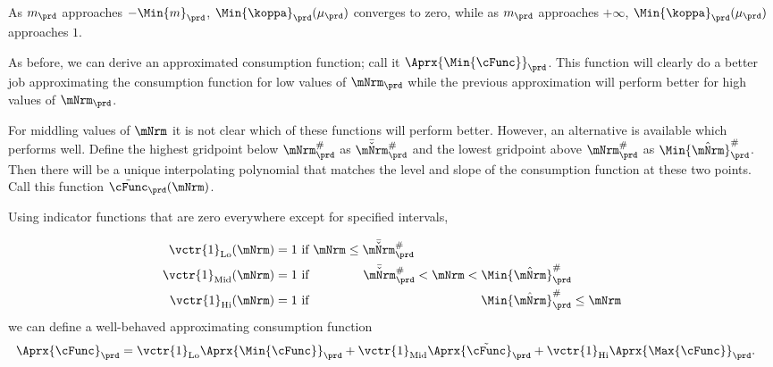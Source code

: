 \documentclass[titlepage, headings=optiontotocandhead]{econark}
\begin{document}


  As $m_{\prd}$ approaches
  $-\Min{m}_{\prd}$, $\Min{\koppa}_{\prd}(\mu_{\prd})$ converges to zero, while as $m_{\prd}$
  approaches $+\infty$, $\Min{\koppa}_{\prd}(\mu_{\prd})$ approaches $1$.

  As before, we can derive an approximated consumption function; call it $\Aprx{\Min{\cFunc}}_{\prd}$.  This function will clearly do a better job approximating the consumption function for low values of $\mNrm_{\prd}$ while the previous approximation will perform better for high values of $\mNrm_{\prd}$.

  For middling values of $\mNrm$ it is not clear which of these functions will perform better.  However, an alternative is available which performs well.  Define the highest gridpoint below $\mtCusp$ as $\bar{\check{\mNrm}}_{\prd}^{\#}$ and the lowest gridpoint above $\mtCusp$ as $\Min{\hat{\mNrm}}_{\prd}^{\#}$.  Then there will be a unique interpolating polynomial that matches the level and slope of the consumption function at these two points.  Call this function $\tilde{\cFunc}_{\prd}(\mNrm)$.

  Using indicator functions that are zero everywhere except for specified intervals,



  \begin{equation*}\begin{gathered}\begin{aligned}
        \vctr{1}_{\text{Lo}}(\mNrm)  & = 1 \text{~if $          \mNrm \leq  \bar{\check{\mNrm}}_{\prd}^{\#} \phantom{< \mNrm <   \Min{\hat{\mNrm}}_{\prd}^{\#}          \leq \mNrm}$}
        \\  \vctr{1}_{\text{Mid}}(\mNrm)  & = 1 \text{~if $\phantom{ \mNrm \leq}~ \bar{\check{\mNrm}}_{\prd}^{\#}          < \mNrm <   \Min{\hat{\mNrm}}_{\prd}^{\#} \phantom{\leq \mNrm}$}
        \\  \vctr{1}_{\text{Hi}}(\mNrm)  & = 1 \text{~if $\phantom{ \mNrm \leq  ~\bar{\check{\mNrm}}_{\prd}^{\#}          < \mNrm < } \Min{\hat{\mNrm}}_{\prd}^{\#}           \leq \mNrm$}
      \end{aligned}\end{gathered}\end{equation*}
  we can define a well-behaved approximating consumption function
  \begin{equation}\begin{gathered}\begin{aligned}
        \Aprx{\cFunc}_{\prd}  & = \vctr{1}_{\text{Lo}} \Aprx{\Min{\cFunc}}_{\prd} + \vctr{1}_{\text{Mid}} \Aprx{\tilde{\cFunc}}_{\prd}+\vctr{1}_{\text{Hi}} \Aprx{\Max{\cFunc}}_{\prd}.
      \end{aligned}\end{gathered}\end{equation}
\end{document}
